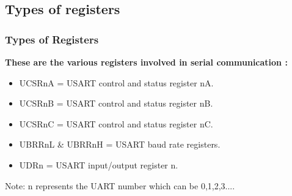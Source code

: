 \documentclass[table,10pt,red]{beamer}	%
\begin{document}
\subsection{Types of registers}
\begin{frame}
\frametitle{Types of Registers}
\textbf{These are the various registers involved in serial communication :}
	\begin{itemize}
		\item <+-|alert@+> UCSRnA = USART control and status register nA.
		\item <+-|alert@+> UCSRnB = USART control and status register nB.
		\item <+-|alert@+> UCSRnC = USART control and status register nC.
		\item <+-|alert@+> UBRRnL \& UBRRnH = USART baud rate registers.
		\item <+-|alert@+> UDRn = USART input/output register n.
	\end{itemize}
	\begin{small}Note: n represents the UART number which can be 0,1,2,3....\end{small}
\end{frame}
\end{document}
